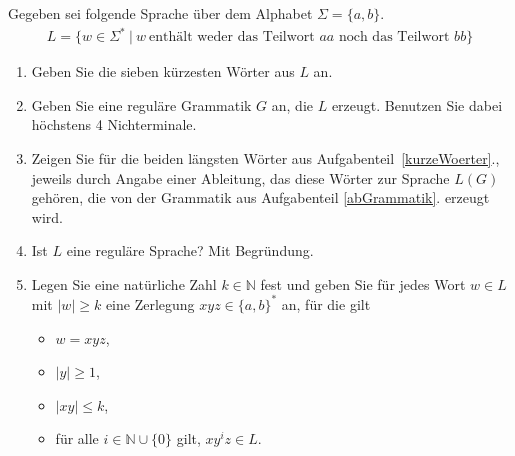 \documentclass{uebungsblatt}
\begin{document}
\newpage
\begin{aufgabe}
	\medskip
	Gegeben sei folgende Sprache über dem Alphabet $\Sigma = \{a,b\}$.
	\begin{align*}
		L = \{ w \in \Sigma^* \ | \ w\ \mbox{enthält weder das Teilwort $aa$ noch das Teilwort $bb$} \}
	\end{align*}

	\begin{enumerate}
		\item
		      \label{kurzeWoerter}
		      Geben Sie die sieben kürzesten Wörter aus $L$ an.\\
		\item
		      \label{abGrammatik}
		      Geben Sie eine reguläre Grammatik $G$ an, die $L$ erzeugt.
		      Benutzen Sie dabei höchstens 4 Nichterminale.\\
		\item
		      Zeigen Sie für die beiden längsten Wörter aus Aufgabenteil~\ref{kurzeWoerter}., jeweils
		      durch Angabe einer Ableitung, das diese Wörter zur Sprache $L(G)$ gehören, die
		      von der Grammatik aus Aufgabenteil \ref{abGrammatik}. erzeugt wird.\\
		\item
		      Ist $L$ eine reguläre Sprache? Mit Begründung.\\
		\item
		      Legen Sie eine natürliche Zahl $k \in \mathbb{N}$ fest und
		      geben Sie für jedes Wort $w \in L$ mit $|w| \ge k$ eine Zerlegung
		      $xyz \in \{a, b\}^*$ an, für die gilt
		      \begin{itemize}
			      \item
			            $w = xyz$,
			      \item
			            $|y| \ge 1$,
			      \item
			            $|xy| \le k$,
			      \item
			            für alle $i \in \mathbb{N} \cup \{0\}$ gilt, $xy^{i}z \in L$.
		      \end{itemize}
	\end{enumerate}
\end{aufgabe}
\end{document}
